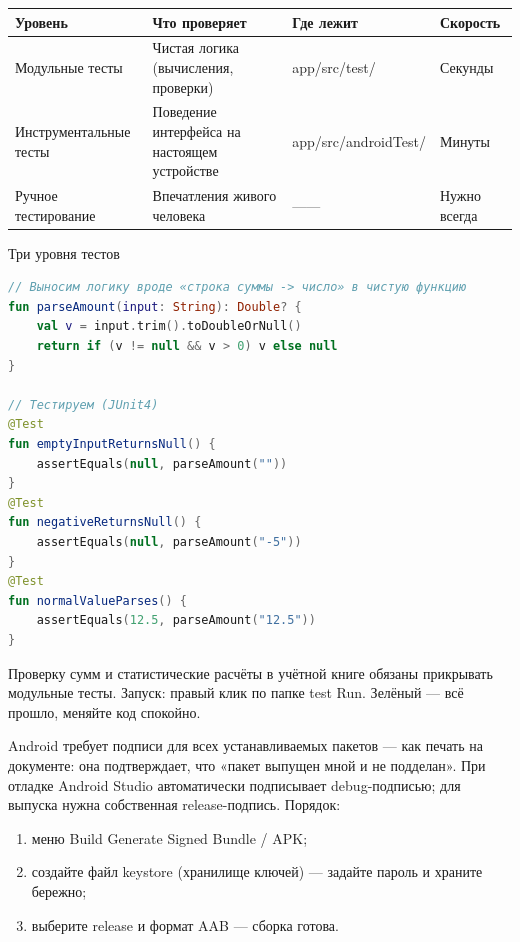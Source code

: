 \begin{center}
\begin{tabularx}{\linewidth}{|X|X|X|X|}
\hline
\textbf{Уровень} & \textbf{Что проверяет} & \textbf{Где лежит} & \textbf{Скорость} \tabularnewline
\hline
Модульные тесты & Чистая логика (вычисления, проверки) & app/src/test/ & Секунды \tabularnewline
Инструментальные тесты & Поведение интерфейса на настоящем устройстве & app/src/androidTest/ & Минуты \tabularnewline
Ручное тестирование & Впечатления живого человека & —— & Нужно всегда \tabularnewline
\hline
\end{tabularx}
\end{center}

\begin{center}\small\color{gray}Три уровня тестов\end{center}

\begin{lstlisting}[language=Kotlin]
// Выносим логику вроде «строка суммы -> число» в чистую функцию
fun parseAmount(input: String): Double? {
    val v = input.trim().toDoubleOrNull()
    return if (v != null && v > 0) v else null
}

// Тестируем (JUnit4)
@Test
fun emptyInputReturnsNull() {
    assertEquals(null, parseAmount(""))
}
@Test
fun negativeReturnsNull() {
    assertEquals(null, parseAmount("-5"))
}
@Test
fun normalValueParses() {
    assertEquals(12.5, parseAmount("12.5"))
}
\end{lstlisting}

Проверку сумм и статистические расчёты в учётной книге обязаны прикрывать модульные тесты. Запуск: правый клик по папке test Run. Зелёный — всё прошло, меняйте код спокойно.


Android требует подписи для всех устанавливаемых пакетов — как печать на документе: она подтверждает, что «пакет выпущен мной и не подделан». При отладке Android Studio автоматически подписывает debug-подписью; для выпуска нужна собственная release-подпись. Порядок:

\begin{enumerate}
  \item меню Build Generate Signed Bundle / APK;
  \item создайте файл keystore (хранилище ключей) — задайте пароль и храните бережно;
  \item выберите release и формат AAB — сборка готова.
\end{enumerate}

